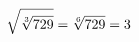 \documentclass[preview]{standalone}
\begin{document}
\begin{align*}
\special{dvisvgm:raw <g id='unique000'>}\sqrt{\sqrt[3]{729}} = \sqrt[6]{729} = 3\special{dvisvgm:raw </g>}
\end{align*}
\end{document}
